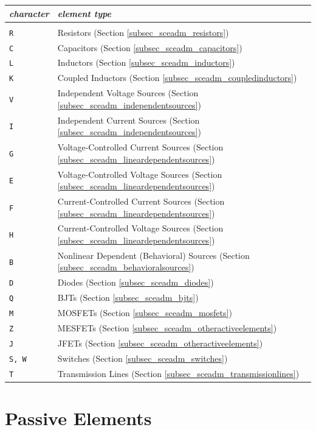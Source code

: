 \begin{tabular}{lp{14cm}}
\textit{character} & \textit{element type}\\ \hline \\ \vspace{-0.8\parskip}
\texttt{R} & Resistors (Section \ref{subsec_sceadm_resistors}) \\
\texttt{C} & Capacitors (Section \ref{subsec_sceadm_capacitors}) \\
\texttt{L} & Inductors (Section \ref{subsec_sceadm_inductors}) \\
\texttt{K} & Coupled Inductors (Section \ref{subsec_sceadm_coupledinductors}) \\
\texttt{V} & Independent Voltage Sources (Section \ref{subsec_sceadm_independentsources}) \\
\texttt{I} & Independent Current Sources (Section \ref{subsec_sceadm_independentsources}) \\
\texttt{G} & Voltage-Controlled Current Sources (Section \ref{subsec_sceadm_lineardependentsources}) \\
\texttt{E} & Voltage-Controlled Voltage Sources (Section \ref{subsec_sceadm_lineardependentsources}) \\
\texttt{F} & Current-Controlled Current Sources (Section \ref{subsec_sceadm_lineardependentsources}) \\
\texttt{H} & Current-Controlled Voltage Sources (Section \ref{subsec_sceadm_lineardependentsources}) \\ 
\texttt{B} & Nonlinear Dependent (Behavioral) Sources (Section \ref{subsec_sceadm_behavioralsources}) \\
\texttt{D} & Diodes (Section \ref{subsec_sceadm_diodes}) \\
\texttt{Q} & BJTs (Section \ref{subsec_sceadm_bjts}) \\
\texttt{M} & MOSFETs (Section \ref{subsec_sceadm_mosfets}) \\
\texttt{Z} & MESFETs (Section \ref{subsec_sceadm_otheractiveelements}) \\
\texttt{J} & JFETs (Section \ref{subsec_sceadm_otheractiveelements}) \\
\texttt{S, W} & Switches (Section \ref{subsec_sceadm_switches}) \\
\texttt{T} & Transmission Lines (Section \ref{subsec_sceadm_transmissionlines}) \\

\end{tabular}

\section{Passive Elements}
\label{sec_sceadm_passiveelements}

